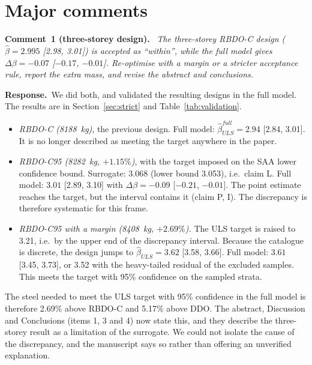 \documentclass[11pt]{article}
\newenvironment{comment}[1]{\par\medskip\noindent\textbf{Comment~#1.}\ \itshape}{\par}
\newcommand{\resp}{\par\noindent\textbf{Response.}\ }
\begin{document}
\section*{Major comments}

\begin{comment}{1 (three-storey design)}
The three-storey RBDO-C design ($\hat\beta=2.995$ [2.98, 3.01]) is accepted as ``within'', while the
full model gives $\Delta\beta=-0.07$ [$-0.17$, $-0.01$]. Re-optimise with a margin or a stricter
acceptance rule, report the extra mass, and revise the abstract and conclusions.
\end{comment}
\resp We did both, and validated the resulting designs in the full model. The results are in
Section~\ref{sec:strict} and Table~\ref{tab:validation}.
\begin{itemize}[itemsep=0.1em]
\item \emph{RBDO-C (8188~kg)}, the previous design. Full model: $\hat\beta^{full}_{ULS}=2.94$ [2.84,
3.01]. It is no longer described as meeting the target anywhere in the paper.
\item \emph{RBDO-C95 (8282~kg, $+1.15\%$)}, with the target imposed on the SAA lower confidence
bound. Surrogate: $3.068$ (lower bound 3.053), i.e.\ claim L. Full model: $3.01$ [2.89, 3.10] with
$\Delta\beta=-0.09$ [$-0.21$, $-0.01$]. The point estimate reaches the target, but the interval
contains it (claim P, I). The discrepancy is therefore systematic for this frame.
\item \emph{RBDO-C95 with a margin (8408~kg, $+2.69\%$).} The ULS target is raised to 3.21, i.e.\ by
the upper end of the discrepancy interval. Because the catalogue is discrete, the design jumps to
$\hat\beta_{ULS}=3.62$ [3.58, 3.66]. Full model: $3.61$ [3.45, 3.73], or 3.52 with the heavy-tailed
residual of the excluded samples. This meets the target with 95\% confidence on the sampled strata.
\end{itemize}
The steel needed to meet the ULS target with 95\% confidence in the full model is therefore 2.69\%
above RBDO-C and 5.17\% above DDO. The abstract, Discussion and Conclusions (items 1, 3 and 4) now
state this, and they describe the three-storey result as a limitation of the surrogate. We could not
isolate the cause of the discrepancy, and the manuscript says so rather than offering an
unverified explanation.
\end{document}
